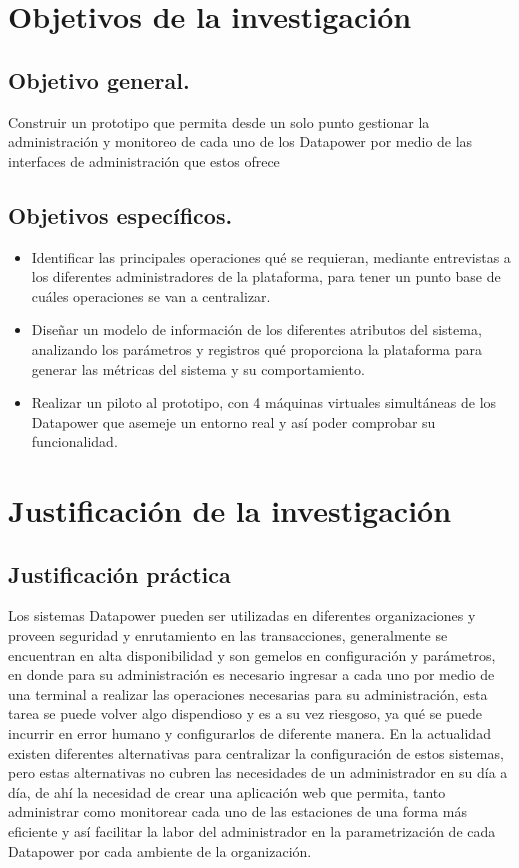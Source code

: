 \section{Objetivos de la investigación}
\subsection{Objetivo general.}
Construir un prototipo que permita desde un solo punto gestionar la administración y monitoreo de cada uno de los Datapower por medio de las interfaces de administración que estos ofrece
\subsection{Objetivos específicos.}
\begin{itemize}
    \item Identificar las principales operaciones qué se requieran, mediante entrevistas a los diferentes administradores de la plataforma, para tener un punto base de cuáles operaciones se van a centralizar.
    \item Diseñar un modelo de información de los diferentes atributos del sistema, analizando los parámetros y registros qué proporciona la plataforma para generar las métricas del sistema y su comportamiento.
    \item Realizar un piloto al prototipo, con 4 máquinas virtuales simultáneas de los Datapower  que asemeje un entorno real y así poder comprobar su funcionalidad.
\end{itemize}
\newpage
\section{Justificación de la investigación}
\subsection{Justificación práctica}
Los sistemas Datapower  pueden ser utilizadas en diferentes organizaciones y proveen seguridad y enrutamiento en las transacciones, generalmente se encuentran en alta disponibilidad y son gemelos en configuración y parámetros, en donde para su administración es necesario ingresar a cada uno por medio de una terminal a realizar las operaciones necesarias para su administración, esta tarea se puede volver algo dispendioso y es a su vez riesgoso, ya qué se puede incurrir en error humano y configurarlos de diferente manera. En la actualidad existen diferentes alternativas para centralizar la configuración de estos sistemas, pero estas alternativas no cubren las necesidades de un administrador en su día a día, de ahí la necesidad de crear una aplicación web que permita, tanto administrar como monitorear cada uno de las estaciones de una forma más eficiente y así facilitar la labor del administrador en la parametrización de cada Datapower  por cada ambiente de la organización.
\newpage
